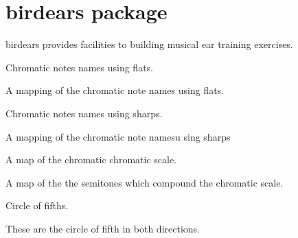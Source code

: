 \documentclass[letterpaper,10pt,english]{sphinxmanual}
\begin{document}
\chapter{birdears package}
\label{\detokenize{index:birdears-package}}\label{\detokenize{index:module-birdears}}
birdears provides facilities to building musical ear training exercises.

\begin{fulllineitems}
\label{\detokenize{index:birdears.CHROMATIC_FLAT}}
 \textendash{} Chromatic notes names using flats.

A mapping of the chromatic note names using flats.

\end{fulllineitems}


\begin{fulllineitems}
\label{\detokenize{index:birdears.CHROMATIC_SHARP}}
 \textendash{} Chromatic notes names using sharps.

A mapping of the chromatic note namesu sing sharps

\end{fulllineitems}


\begin{fulllineitems}
\label{\detokenize{index:birdears.CHROMATIC_TYPE}}
 \textendash{} A map of the chromatic chromatic scale.

A map of the the semitones which compound the chromatic scale.

\end{fulllineitems}


\begin{fulllineitems}
\label{\detokenize{index:birdears.CIRCLE_OF_FIFTHS}}
 \textendash{} Circle of fifths.

These are the circle of fifth in both directions.

\end{fulllineitems}
\end{document}
